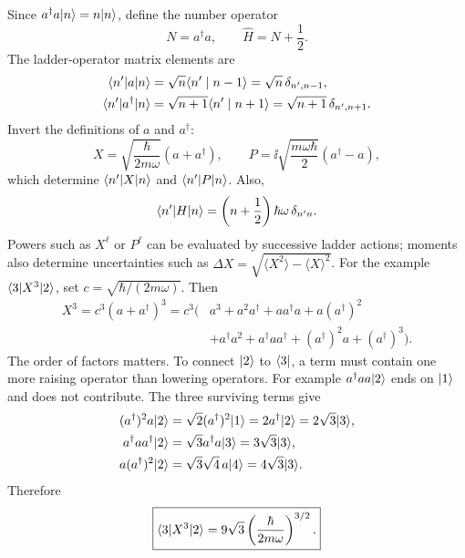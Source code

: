 Since $a^\dagger a\lvert n\rangle=n\lvert n\rangle$, define the number operator
\[
 N=a^\dagger a,\qquad\widehat H=N+\frac12.
\]
The ladder-operator matrix elements are
\begin{align*}
 \langle n'\rvert a\lvert n\rangle&=\sqrt n\langle n'\mid n-1\rangle=\sqrt n\,\delta_{n',n-1},\\
 \langle n'\rvert a^\dagger\lvert n\rangle&=\sqrt{n+1}\langle n'\mid n+1\rangle
 =\sqrt{n+1}\,\delta_{n',n+1}.
\end{align*}
Invert the definitions of $a$ and $a^\dagger$:
\[
 X=\sqrt{\frac{\hbar}{2m\omega}}(a+a^\dagger),\qquad
 P=\ii\sqrt{\frac{m\omega\hbar}{2}}(a^\dagger-a),
\]
which determine $\langle n'\rvert X\lvert n\rangle$ and $\langle n'\rvert P\lvert n\rangle$. Also,
\[
 \langle n'\rvert H\lvert n\rangle=\left(n+\frac12\right)\hbar\omega\,\delta_{n'n}.
\]
Powers such as $X^\ell$ or $P^\ell$ can be evaluated by successive ladder
actions; moments also determine uncertainties such as
$\Delta X=\sqrt{\langle X^2\rangle-\langle X\rangle^2}$.
For the example $\langle 3\rvert X^3\lvert 2\rangle$, set $c=\sqrt{\hbar/(2m\omega)}$. Then
\begin{align*}
 X^3=c^3(a+a^\dagger)^3
 =c^3\bigl(&a^3+a^2a^\dagger+aa^\dagger a+a(a^\dagger)^2\\
            &+a^\dagger a^2+a^\dagger aa^\dagger+(a^\dagger)^2a
              +(a^\dagger)^3\bigr).
\end{align*}
The order of factors matters. To connect $\lvert 2\rangle$ to $\langle 3\rvert$, a term
must contain one more raising operator than lowering operators.
For example $a^\dagger aa\lvert 2\rangle$ ends on $\lvert 1\rangle$ and does not contribute.
The three surviving terms give
\begin{align*}
 (a^\dagger)^2a\lvert 2\rangle
 &=\sqrt2(a^\dagger)^2\lvert 1\rangle=2a^\dagger\lvert 2\rangle=2\sqrt3\lvert 3\rangle,\\
 a^\dagger aa^\dagger\lvert 2\rangle
 &=\sqrt3a^\dagger a\lvert 3\rangle=3\sqrt3\lvert 3\rangle,\\
 a(a^\dagger)^2\lvert 2\rangle
 &=\sqrt3\sqrt4\,a\lvert 4\rangle=4\sqrt3\lvert 3\rangle.
\end{align*}
Therefore
\[
 \boxed{\langle 3\rvert X^3\lvert 2\rangle=9\sqrt3\left(\frac{\hbar}{2m\omega}\right)^{3/2}.}
\]
